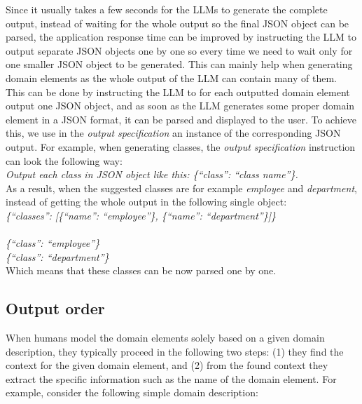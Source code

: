 Since it usually takes a few seconds for the LLMs to generate the complete output, instead of waiting for the whole output so the final JSON object can be parsed, the application response time can be improved by instructing the LLM to output separate JSON objects one by one so every time we need to wait only for one smaller JSON object to be generated. This can mainly help when generating domain elements as the whole output of the LLM can contain many of them. This can be done by instructing the LLM to for each outputted domain element output one JSON object, and as soon as the LLM generates some proper domain element in a JSON format, it can be parsed and displayed to the user. To achieve this, we use in the \emph{output specification} an instance of the corresponding JSON output. For example, when generating classes, the \emph{output specification} instruction can look the following way: \\

\noindent{}\textit{Output each class in JSON object like this: \{``class'': ``class name''\}.} \\

\noindent{}As a result, when the suggested classes are for example \textit{employee} and \textit{department}, instead of getting the whole output in the following single object: \\

\noindent{}\textit{\{``classes'': [\{``name'': ``employee''\}, \{``name'': ``department''\}]\}} \\

 \\

\noindent{}\textit{\{``class'': ``employee''\} \\
\{``class'': ``department''\}} \\

\noindent{}Which means that these classes can be now parsed one by one.


\subsection{Output order}
\label{sec:output_order}

When humans model the domain elements solely based on a given domain description, they typically proceed in the following two steps: (1) they find the context for the given domain element, and (2) from the found context they extract the specific information such as the name of the domain element. For example, consider the following simple domain description: \\

